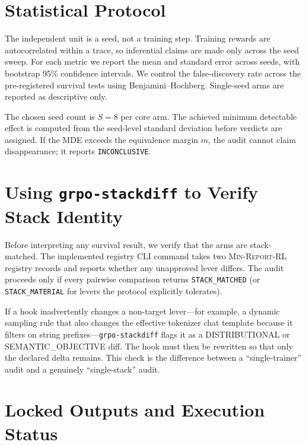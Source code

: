 \documentclass[11pt]{article}
\newcommand{\minreport}{\textsc{Min-Report-RL}}
\begin{document}
\section{Statistical Protocol}
\label{sec:stats}


The independent unit is a seed, not a training step. Training rewards are
autocorrelated within a trace, so inferential claims are made only across the
seed sweep. For each metric we report the mean and standard error across seeds,
with bootstrap 95\% confidence intervals. We control the false-discovery rate
across the pre-registered survival tests using Benjamini--Hochberg. Single-seed
arms are reported as descriptive only.

The chosen seed count is $S=8$ per core arm. The achieved minimum detectable
effect is computed from the seed-level standard deviation before verdicts are
assigned. If the MDE exceeds the equivalence margin $m$, the audit cannot claim
disappearance; it reports \texttt{INCONCLUSIVE}.

\section{Using \texttt{grpo-stackdiff} to Verify Stack Identity}
\label{sec:stackdiff}


Before interpreting any survival result, we verify that the arms are
stack-matched. The implemented registry CLI command
 \cite{minreportrl2026}
takes two \minreport{} registry records and reports
whether any unapproved lever differs. The audit proceeds only if every pairwise
comparison returns \texttt{STACK\_MATCHED} (or \texttt{STACK\_MATERIAL} for
levers the protocol explicitly tolerates).

If a hook inadvertently changes a non-target lever---for example, a dynamic
sampling rule that also changes the effective tokenizer chat template because
it filters on string prefixes---\texttt{grpo-stackdiff} flags it as a
DISTRIBUTIONAL or SEMANTIC\_OBJECTIVE diff. The hook must then be rewritten so
that only the declared delta remains. This check is the difference between a
``single-trainer'' audit and a genuinely ``single-stack'' audit.

\section{Locked Outputs and Execution Status}
\end{document}
